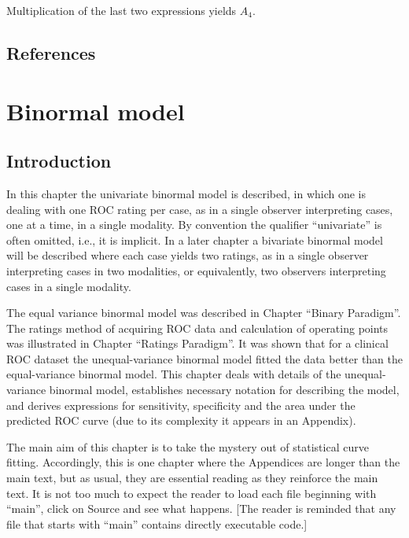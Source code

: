 \documentclass[
]{book}
\begin{document}
Multiplication of the last two expressions yields \(A_4\).

\hypertarget{empirical-AUC-references}{%
\section{References}\label{empirical-AUC-references}}

\hypertarget{BinMod}{%
\chapter{Binormal model}\label{BinMod}}

\hypertarget{BinModIntro}{%
\section{Introduction}\label{BinModIntro}}

In this chapter the univariate binormal model \citep{RN212} is described, in which one is dealing with one ROC rating per case, as in a single observer interpreting cases, one at a time, in a single modality. By convention the qualifier ``univariate'' is often omitted, i.e., it is implicit. In a later chapter a bivariate binormal model will be described where each case yields two ratings, as in a single observer interpreting cases in two modalities, or equivalently, two observers interpreting cases in a single modality.

The equal variance binormal model was described in Chapter ``Binary Paradigm''. The ratings method of acquiring ROC data and calculation of operating points was illustrated in Chapter ``Ratings Paradigm''. It was shown that for a clinical ROC dataset the unequal-variance binormal model fitted the data better than the equal-variance binormal model. This chapter deals with details of the unequal-variance binormal model, establishes necessary notation for describing the model, and derives expressions for sensitivity, specificity and the area under the predicted ROC curve (due to its complexity it appears in an Appendix).

The main aim of this chapter is to take the mystery out of statistical curve fitting. Accordingly, this is one chapter where the Appendices are longer than the main text, but as usual, they are essential reading as they reinforce the main text. It is not too much to expect the reader to load each file beginning with ``main'', click on Source and see what happens. {[}The reader is reminded that any file that starts with ``main'' contains directly executable code.{]}
\end{document}
